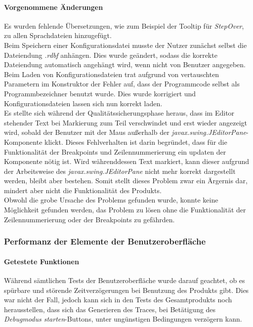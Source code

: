 \documentclass[parskip=full]{scrartcl}
\begin{document}
\paragraph{Vorgenommene Änderungen}
Es wurden fehlende Übersetzungen, wie zum Beispiel der Tooltip für \textit{StepOver}, zu allen Sprachdateien hinzugefügt. \\
Beim Speichern einer Konfigurationsdatei musste der Nutzer zunächst selbst die Dateiendung \textit{.rdbf} anhängen. Dies wurde geändert, sodass die korrekte Dateiendung automatisch angehängt wird, wenn nicht von Benutzer angegeben. \\ 
Beim Laden von Konfigurationsdateien trat aufgrund von vertauschten Parametern im Konstruktor der Fehler auf, dass der Programmcode selbst als Programmbezeichner benutzt wurde. Dies wurde korrigiert und Konfigurationsdateien lassen sich nun korrekt laden. \\
Es stellte sich während der Qualitätssicherungsphase heraus, dass im Editor stehender Text bei Markierung zum Teil verschwindet und erst wieder angezeigt wird, sobald der Benutzer mit der Maus außerhalb der \textit{javax.swing.JEditorPane}-Komponente klickt. Dieses Fehlverhalten ist darin begründet, dass für die Funktionalität der Breakpoints und Zeilennummerierung ein updaten der Komponente nötig ist. Wird währenddessen Text markiert, kann dieser aufgrund der Arbeitsweise des \textit{javax.swing.JEditorPane} nicht mehr korrekt dargestellt werden, bleibt aber bestehen. Somit stellt dieses Problem zwar ein Ärgernis dar, mindert aber nicht die Funktionalität des Produkts. \\ Obwohl die grobe Ursache des Problems gefunden wurde, konnte keine Möglichkeit gefunden werden, das Problem zu lösen ohne die Funktionalität der Zeilennummerierung oder der Breakpoints zu gefährden.
\subsubsection{Performanz der Elemente der Benutzeroberfläche}
\paragraph{Getestete Funktionen}
Während sämtlichen Tests der Benutzeroberfläche wurde darauf geachtet, ob es spürbare und störende Zeitverzögerungen bei Benutzung des Produkts gibt. Dies war nicht der Fall, jedoch kann sich in den Tests des Gesamtprodukts noch herausstellen, dass sich das Generieren des Traces, bei Betätigung des \textit{Debugmodus starten}-Buttons, unter ungünstigen Bedingungen verzögern kann.
\end{document}
